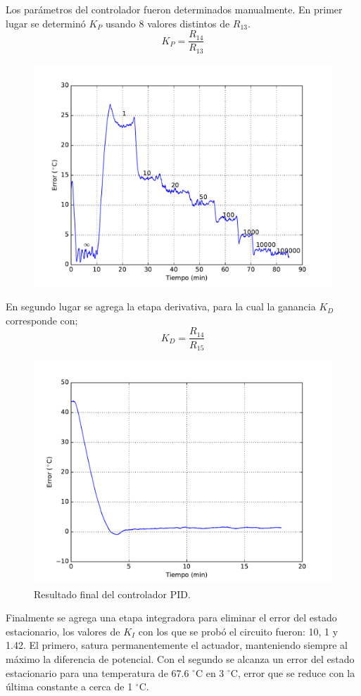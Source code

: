 \documentclass{wileysix}
\begin{document}
Los par\'ametros del controlador fueron determinados manualmente. En primer lugar se determin\'o $K_P$ usando 8 valores distintos de $R_{13}$.
\begin{equation}
	K_P = \frac{R_{14}}{R_{13}}
\end{equation}

\begin{figure}[h]
	\centering
	\includegraphics[width=0.6\linewidth]{extras/KP.pdf}
\end{figure}
En segundo lugar se agrega la etapa derivativa, para la cual la ganancia $K_D$ corresponde con;
\begin{equation}
	K_D = \frac{R_{14}}{R_{15}}
\end{equation}

\begin{figure}[h]
	\centering
	\includegraphics[width=0.6\linewidth]{extras/final_PID.pdf}
	\caption{Resultado final del controlador PID.}
\end{figure}
Finalmente se agrega una etapa integradora para eliminar el error del estado estacionario, los valores de $K_I$ con los que se prob\'o el circuito fueron: 10, 1 y 1.42. El primero, satura permanentemente el actuador, manteniendo siempre al m\'aximo la diferencia de potencial. Con el segundo se alcanza un error del estado estacionario para una temperatura de 67.6 $^\circ$C en 3 $^\circ$C, error que se reduce con la \'ultima constante a cerca de 1 $^\circ$C.
\end{document}
